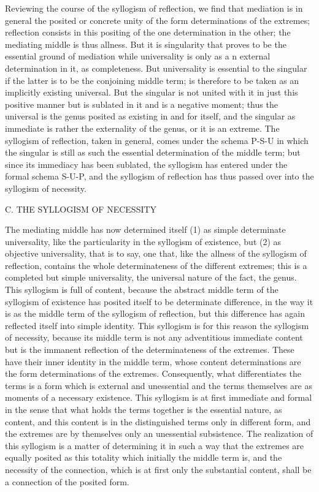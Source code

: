 Reviewing the course of the syllogism of reflection,
we find that mediation is in general
the posited or concrete unity
of the form determinations of the extremes;
reflection consists in this positing of
the one determination in the other;
the mediating middle is thus allness.
But it is singularity that
proves to be the essential ground of mediation
while universality is only as a
n external determination in it, as completeness.
But universality is essential to the singular
if the latter is to be the conjoining middle term;
is therefore to be taken as an implicitly existing universal.
But the singular is not united with it in just this positive manner
but is sublated in it and is a negative moment;
thus the universal is the genus posited
as existing in and for itself,
and the singular as immediate is rather
the externality of the genus,
or it is an extreme.
The syllogism of reflection, taken in general,
comes under the schema P-S-U
in which the singular is still as such
the essential determination of the middle term;
but since its immediacy has been sublated,
the syllogism has entered under the formal schema S-U-P,
and the syllogism of reflection has thus passed over
into the syllogism of necessity.

C. THE SYLLOGISM OF NECESSITY

The mediating middle has now determined itself
(1) as simple determinate universality,
like the particularity in the syllogism of existence,
but (2) as objective universality,
that is to say, one that, like
the allness of the syllogism of reflection,
contains the whole determinateness of the different extremes;
this is a completed but simple universality,
the universal nature of the fact, the genus.
This syllogism is full of content,
because the abstract middle term of the syllogism of existence
has posited itself to be determinate difference,
in the way it is as the middle term of the syllogism of reflection,
but this difference has again reflected itself into simple identity.
This syllogism is for this reason the syllogism of necessity,
because its middle term is not any adventitious immediate content
but is the immanent reflection of the determinateness of the extremes.
These have their inner identity in the middle term,
whose content determinations are
the form determinations of the extremes.
Consequently, what differentiates the terms is a form
which is external and unessential
and the terms themselves are as moments of a necessary existence.
This syllogism is at first immediate and formal
in the sense that what holds the terms together is
the essential nature, as content,
and this content is in the distinguished terms only in different form,
and the extremes are by themselves only an unessential subsistence.
The realization of this syllogism is a matter
of determining it  in such a way that
the extremes are equally posited as this totality
which initially the middle term is,
and the necessity of the connection,
which is at first only the substantial content,
shall be a connection of the posited form.

